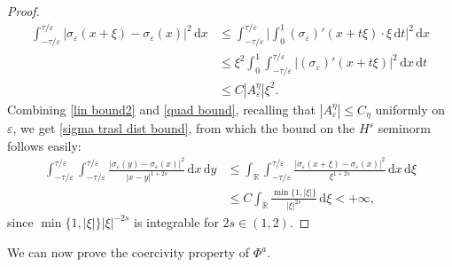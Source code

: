 \documentclass{article}
\theoremstyle{definition}
\newcommand{\abs}[1]{\left|#1\right|}
\newcommand{\de}{\mathrm{d}}
\newcommand{\R}{\mathbb{R}}
\newcommand{\e}{\varepsilon}
\def\e{\varepsilon}
\begin{document}
\begin{proof}
\begin{equation}
      \label{quad bound}
      \begin{split}
            \int_{-\tau/\e}^{\tau/\e} \abs{\sigma_\e(x+\xi) - \sigma_\e(x)}^2\,\de x 
            &\leq \int_{-\tau/\e}^{\tau/\e}\Bigg |\int_0^1(\sigma_\e)'(x+t\xi)\cdot \xi\,\de t\Bigg|^2\,\de x\\
            &\leq \xi^2\int_0^1\int_{-\tau/\e}^{\tau/\e}\big |(\sigma_\e)'(x+t\xi)\big|^2\,\de x\,\de t\\
           & \leq C|A_\e^\eta|\xi^2.
        \end{split}
  \end{equation}
    Combining \eqref{lin bound2} and \eqref{quad bound}, recalling that $|A_\e^\eta|\leq C_\eta$ uniformly on $\e$, we get \eqref{sigma trasl dist bound}, from which the bound on the $H^s$ seminorm follows easily: 
    \[
        \begin{split}
            \int_{-\tau/\e}^{\tau/\e} \int_{-\tau/\e}^{\tau/\e} \frac{\abs{\sigma_\e(y) - \sigma_\e(x)}^2}{|x-y|^{1+2s}}\, \de x\,\de y 
            &\leq \int_\R\int_{-\tau/\e}^{\tau/\e} \frac{\abs{\sigma_\e(x+\xi) - \sigma_\e(x)}^2}{\xi^{1+2s}}\, \de x\,\de \xi\\
            &\leq C\int_\R \frac{\min\{1,|\xi|\}}{|\xi|^{2s}}\, \de \xi <+\infty,
        \end{split}
    \]
    since $ \min\{1,|\xi|\}|\xi|^{-2s}$ is integrable for $2s\in (1,2)$.
\end{proof}


We can now prove the coercivity property of $\Phi^a$.
\end{document}
